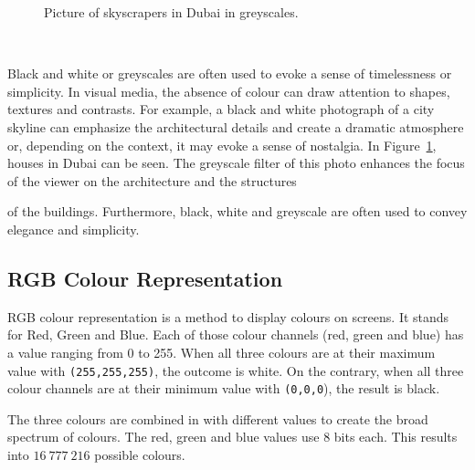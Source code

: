 \documentclass[../MasterThesis.tex]{subfiles}
\begin{document}
\begin{minipage}{0.5\textwidth}
	\begin{figure}[H]
	\begin{center}
		\caption[Picture of skyscrapers in Dubai in greyscales.]{Picture of skyscrapers in Dubai in greyscales.}
		\label{figure:gray}
	\end{center}
\end{figure}\hfill
\end{minipage}\begin{minipage}{0.05\textwidth}
	\ 
\end{minipage}\begin{minipage}{0.45\textwidth}
	Black and white or greyscales are often used to evoke a sense of timelessness or simplicity. In visual media, the absence of colour can draw attention to shapes, textures and contrasts. For example, a black and white photograph of a city skyline can emphasize the architectural details and create a dramatic atmosphere or, depending on the context, it may evoke a sense of nostalgia.
	In Figure~\ref{figure:gray}, houses in Dubai can be seen. The greyscale filter of this photo enhances the focus of the viewer on the architecture and the structures

	
\end{minipage}

\vspace*{-0.6em}
 of the buildings. Furthermore, black, white and greyscale are often used to convey elegance and simplicity.~\cite{colour2}


%





\subsection{RGB Colour Representation}
\label{subsection:RGB}


RGB colour representation is a method to display colours on screens. It stands for Red, Green and Blue. 
Each of those colour channels (red, green and blue) has a value ranging from 0 to 255. When all three colours are at their maximum value with \texttt{(255,255,255)}, the outcome is white. On the contrary, when all three colour channels are at their minimum value with \texttt{(0,0,0}), the result is black.~\cite{colourRGB}

The three colours are combined in with different values to create the broad spectrum of colours. The red, green and blue values use 8 bits each. This results into $16\ 777\ 216$ possible colours.
\end{document}
